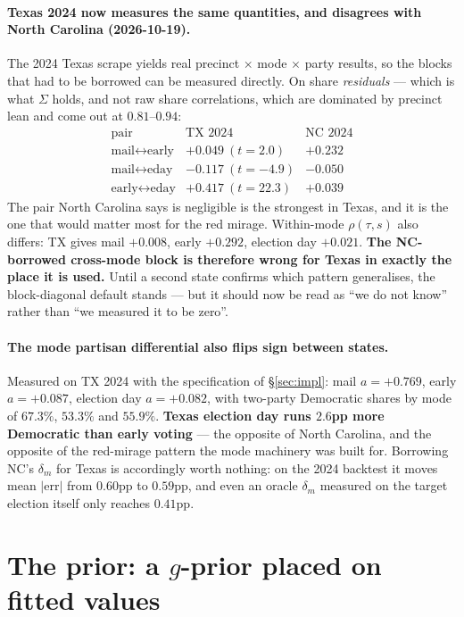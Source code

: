 \documentclass[11pt]{article}
\begin{document}
\paragraph{Texas 2024 now measures the same quantities, and disagrees with North Carolina
(2026-10-19).} The 2024 Texas scrape yields real precinct $\times$ mode $\times$ party
results, so the blocks that had to be borrowed can be measured directly. On share
\emph{residuals} --- which is what $\Sigma$ holds, and not raw share correlations, which
are dominated by precinct lean and come out at $0.81$--$0.94$:
\[
\begin{array}{lrr}
\textrm{pair} & \textrm{TX 2024} & \textrm{NC 2024}\\
\textrm{mail}\leftrightarrow\textrm{early} & +0.049\ (t=2.0) & +0.232\\
\textrm{mail}\leftrightarrow\textrm{eday}  & -0.117\ (t=-4.9) & -0.050\\
\textrm{early}\leftrightarrow\textrm{eday} & \mathbf{+0.417}\ (t=22.3) & +0.039
\end{array}
\]
The pair North Carolina says is negligible is the strongest in Texas, and it is the one
that would matter most for the red mirage. Within-mode $\rho(\tau,s)$ also differs: TX
gives mail $+0.008$, early $+0.292$, election day $+0.021$. \textbf{The NC-borrowed
cross-mode block is therefore wrong for Texas in exactly the place it is used.} Until a
second state confirms which pattern generalises, the block-diagonal default stands --- but
it should now be read as ``we do not know'' rather than ``we measured it to be zero''.

\paragraph{The mode partisan differential also flips sign between states.} Measured on
TX 2024 with the specification of \S\ref{sec:impl}: mail $a=+0.769$, early $a=+0.087$,
election day $a=+0.082$, with two-party Democratic shares by mode of $67.3\%$, $53.3\%$ and
$55.9\%$. \textbf{Texas election day runs $2.6$pp more Democratic than early voting} ---
the opposite of North Carolina, and the opposite of the red-mirage pattern the mode
machinery was built for. Borrowing NC's $\delta_m$ for Texas is accordingly worth nothing:
on the 2024 backtest it moves mean $|\textrm{err}|$ from $0.60$pp to $0.59$pp, and even an
oracle $\delta_m$ measured on the target election itself only reaches $0.41$pp.

\section{The prior: a $g$-prior placed on fitted values}\label{sec:prior}
\end{document}

